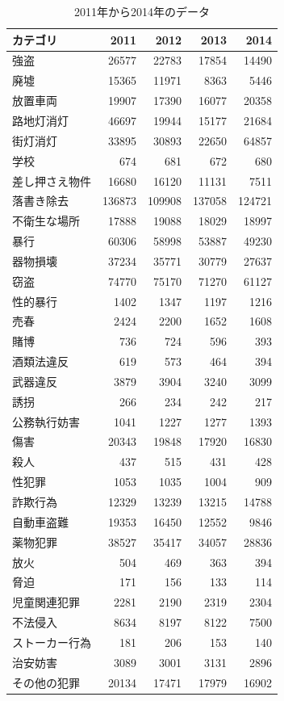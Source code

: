 \begin{table}[t]
  \centering
  \caption{2011年から2014年のデータ}
  \label{tab:2011-2014-data}
  \begin{tabular}{lrrrr}
  \toprule
  カテゴリ & 2011 & 2012 & 2013 & 2014 \\
  \midrule
  強盗 & 26577 & 22783 & 17854 & 14490 \\
  \midrule
  廃墟 & 15365 & 11971 & 8363 & 5446 \\
  放置車両 & 19907 & 17390 & 16077 & 20358 \\
  路地灯消灯 & 46697 & 19944 & 15177 & 21684 \\
  街灯消灯 & 33895 & 30893 & 22650 & 64857 \\
  学校 & 674 & 681 & 672 & 680 \\
  差し押さえ物件 & 16680 & 16120 & 11131 & 7511 \\
  落書き除去 & 136873 & 109908 & 137058 & 124721 \\
  不衛生な場所 & 17888 & 19088 & 18029 & 18997 \\
  \midrule
  暴行 & 60306 & 58998 & 53887 & 49230 \\
  器物損壊 & 37234 & 35771 & 30779 & 27637 \\
  窃盗 & 74770 & 75170 & 71270 & 61127 \\
  性的暴行 & 1402 & 1347 & 1197 & 1216 \\
  売春 & 2424 & 2200 & 1652 & 1608 \\
  賭博 & 736 & 724 & 596 & 393 \\
  酒類法違反 & 619 & 573 & 464 & 394 \\
  武器違反 & 3879 & 3904 & 3240 & 3099 \\
  誘拐 & 266 & 234 & 242 & 217 \\
  公務執行妨害 & 1041 & 1227 & 1277 & 1393 \\
  傷害 & 20343 & 19848 & 17920 & 16830 \\
  殺人 & 437 & 515 & 431 & 428 \\
  性犯罪 & 1053 & 1035 & 1004 & 909 \\
  詐欺行為 & 12329 & 13239 & 13215 & 14788 \\
  自動車盗難 & 19353 & 16450 & 12552 & 9846 \\
  薬物犯罪 & 38527 & 35417 & 34057 & 28836 \\
  放火 & 504 & 469 & 363 & 394 \\
  脅迫 & 171 & 156 & 133 & 114 \\
  児童関連犯罪 & 2281 & 2190 & 2319 & 2304 \\
  不法侵入 & 8634 & 8197 & 8122 & 7500 \\
  ストーカー行為 & 181 & 206 & 153 & 140 \\
  治安妨害 & 3089 & 3001 & 3131 & 2896 \\
  その他の犯罪 & 20134 & 17471 & 17979 & 16902 \\
  \bottomrule
  \end{tabular}
  \end{table}

